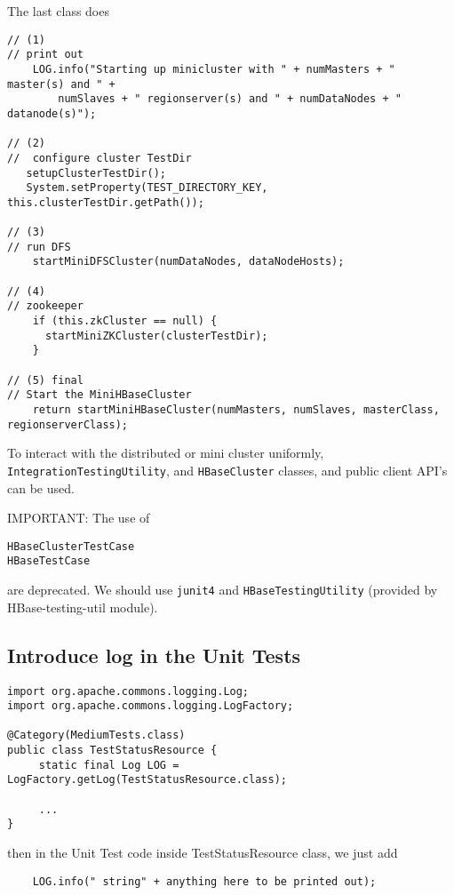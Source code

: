The last class does
\begin{verbatim}
// (1)
// print out
    LOG.info("Starting up minicluster with " + numMasters + " master(s) and " +                                                                                            
        numSlaves + " regionserver(s) and " + numDataNodes + " datanode(s)");                                                                                              
                                                                                
// (2)
//  configure cluster TestDir
   setupClusterTestDir();
   System.setProperty(TEST_DIRECTORY_KEY, this.clusterTestDir.getPath());
                                                                                
// (3)
// run DFS
    startMiniDFSCluster(numDataNodes, dataNodeHosts);

// (4)
// zookeeper
    if (this.zkCluster == null) {
      startMiniZKCluster(clusterTestDir);
    }

// (5) final
// Start the MiniHBaseCluster
    return startMiniHBaseCluster(numMasters, numSlaves, masterClass, regionserverClass);

\end{verbatim}


\begin{mdframed}
To interact with the distributed or mini cluster
uniformly, \verb!IntegrationTestingUtility!, and \verb!HBaseCluster! classes,
and public client API's can be used. 

IMPORTANT: The use of 
\begin{verbatim}
HBaseClusterTestCase
HBaseTestCase
\end{verbatim}
are deprecated. We should use \verb!junit4! and \verb!HBaseTestingUtility!
(provided by HBase-testing-util module).

\end{mdframed}


\subsection{Introduce log in the Unit Tests}

\begin{verbatim}
import org.apache.commons.logging.Log; 
import org.apache.commons.logging.LogFactory; 

@Category(MediumTests.class)                                                                                                                                              
public class TestStatusResource {                                                                                                                                         
     static final Log LOG = LogFactory.getLog(TestStatusResource.class);
     
     ...
}
\end{verbatim}
then in the Unit Test code inside TestStatusResource class, we just add
\begin{verbatim}
    LOG.info(" string" + anything here to be printed out); 
\end{verbatim}


